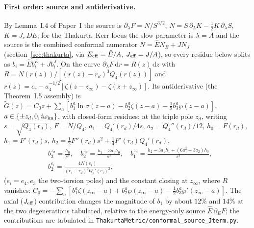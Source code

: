 \documentclass[12pt]{iopart}
\theoremstyle{plain}
\theoremstyle{definition}
\theoremstyle{remark}
\newcommand{\Ehat}{\hat E}
\newcommand{\Jc}{J_{c}}
\newcommand{\dd}{\mathrm{d}}
\begin{document}
\paragraph{First order: source and antiderivative.}
By Lemma~I.4 of Paper~I the source is $\partial_\lambda F=N/S^{3/2}$,
$N=S\,\partial_\lambda K-\tfrac12K\,\partial_\lambda S$, $K=\Jc\,DE$; for the
Thakurta--Kerr locus the slow parameter is $\lambda=A$ and the source is the
combined conformal numerator $N=\Ehat N_E+J N_J$ (section~\ref{sec:thakurta}, via
$E_{\rm eff}=\Ehat/A$, $J_{\rm eff}=J/A$), so every residue below splits as
$b_i=\Ehat b_i^{E}+J b_i^{J}$. On the curve $\partial_\lambda F\,\dd r=R(z)\,\dd z$
with $R=N(r(z))/[(r(z)-r_d)^3Q_4(r(z))]$ and $r(z)=c_r-a_4^{-1/2}[\zeta(z-z_\infty)-
\zeta(z+z_\infty)]$. Its antiderivative (the Theorem~I.5 assembly) is
$\tilde G(z)=C_0 z+\sum_{a}[b_1^a\ln\sigma(z-a)-b_2^a\zeta(z-a)-\tfrac12 b_3^a
\wp(z-a)]$, $a\in\{\pm z_d,0,i\omega_{\rm im}\}$, with closed-form residues: at the
triple pole $z_d$, writing $s=\sqrt{Q_4(r_d)}$, $F=N/Q_4$, $a_1=Q_4'(r_d)/4s$,
$a_2=Q_4''(r_d)/12$, $h_0=F(r_d)$, $h_1=F'(r_d)s$,
$h_2=\tfrac12F''(r_d)s^2+\tfrac14F'(r_d)Q_4'(r_d)$,
\begin{equation}
\begin{split}
&b_3^{z_d}=\frac{h_0}{s^3},\quad b_2^{z_d}=\frac{h_1-3a_1h_0}{s^3},\quad
b_1^{z_d}=\frac{h_2-3a_1h_1+(6a_1^2-3a_2)h_0}{s^3},\\
&b_2^{e_i}=\frac{4N(e_i)}{(e_i-r_d)^3Q_4'(e_i)^2},
\end{split}
\end{equation}
($e_i=e_4,e_3$ the two-torsion poles) and the constant closing at $z_\infty$, where
$R$ vanishes: $C_0=-\sum_a[b_1^a\zeta(z_\infty-a)+b_2^a\wp(z_\infty-a)-\tfrac12
b_3^a\wp'(z_\infty-a)]$. The axial ($J_{\rm eff}$) contribution changes the magnitude of $b_1$
by about $12\%$ and $14\%$ at the two degenerations tabulated, relative to the
energy-only source $\Ehat\,\partial_E F$; the contributions are tabulated in
\texttt{ThakurtaMetric/conformal\_source\_Jterm.py}.
\end{document}
